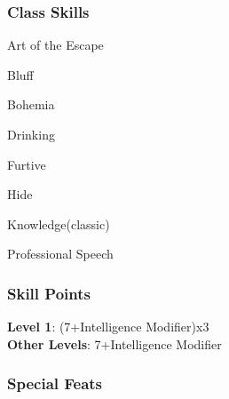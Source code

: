 \documentclass[ letterpaper,12pt]{article}
\begin{document}
\subsubsection{Class Skills}
\begin{itemize}
{\it 
\item{Art of the Escape}
\item{Bluff}
\item{Bohemia}
\item{Drinking}
\item{Furtive}
\item{Hide}
\item{Knowledge(classic)}
\item{Professional Speech}
}
\end{itemize}

\subsubsection{Skill Points}
{\bf Level 1}: (7+Intelligence Modifier)x3\\
{\bf Other Levels}: 7+Intelligence Modifier\\

\subsubsection{Special Feats}
\end{document}
